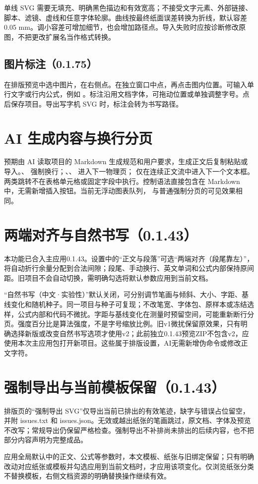 单线 SVG 需要无填充、明确黑色描边和有效宽高；不接受文字元素、外部链接、脚本、滤镜、虚线和任意字体轮廓。曲线按最终纸面误差转换为折线，默认容差 0.05 mm。调小容差可增加细节，也会增加路径点。导入失败时应按诊断修改原图，不把更改扩展名当作格式转换。

\subsection{图片标注（0.1.75）}
在排版预览中选中图片，在右侧点。在独立窗口中点，再点击图内位置。可输入单行文字或行内公式，例如 。标注沿用文档字体，可拖动位置或单独调整字号。点后保存项目。导出写字机 SVG 时，标注会转为书写路径。

\section{AI 生成内容与换行分页}
预期由 AI 读取项目的 Markdown 生成规范和用户要求，生成正文后复制粘贴或导入。\code{\newline}、\code{\linebreak} 强制换行；\code{\newpage}、\code{\pagebreak}、\code{\clearpage} 进入下一物理页；\code{\framebreak} 仅在连续正文流中进入下一个文本框。两类跳转不在表格单元格或固定字段中执行。控制语法直接包含在 Markdown 中，无需新增插入按钮。当前无浮动图表队列，\code{\clearpage} 与普通强制分页的可见效果相同。


\section{两端对齐与自然书写（0.1.43）}
本功能已合入主应用0.1.43。设置中的“正文与段落”可选“两端对齐（段尾靠左）”，将自动折行余量分配到合法间隙；段尾、手动换行、英文单词和公式内部保持原间距。旧项目不会自动切换，需明确勾选将默认参数应用到当前文档。

“自然书写（中文·实验性）”默认关闭，可分别调节笔画与倾斜、大小、字距、基线变化和随机种子。同一项目与种子可复现；不改笔宽、字体包、原样本或冻结选样，公式内部和代码不微扰。字距与基线变化在测量时预留空间，可能重新断行分页。强度百分比是算法强度，不是字号缩放比例。旧v1微扰保留原效果，只有明确选择新版或改变自然书写选项才使用v2；此前独立0.1.43预览ZIP不包含v2，应使用本次主应用包打开新项目。这些属于排版设置，AI无需新增伪命令或修改正文字符。


\section{强制导出与当前模板保留（0.1.43）}
排版页的“强制导出 SVG”仅导出当前已排出的有效笔迹，缺字与错误占位留空，并附 issues.txt 和 issues.json。无效或越出纸张的笔画跳过，原文档、字体及预览不改写；常规导出仍保留严格检查。强制导出不补排尚未排出的后续内容，也不把部分内容声明为完整成品。

应用全局默认中的正文、公式等参数时，本文模板、纸张与旧绑定保留；只有明确改动对应纸张或模板并勾选应用到当前文档时，才应用该项变化。仅浏览纸张分类不替换模板，右侧文档资源的明确替换操作继续有效。

